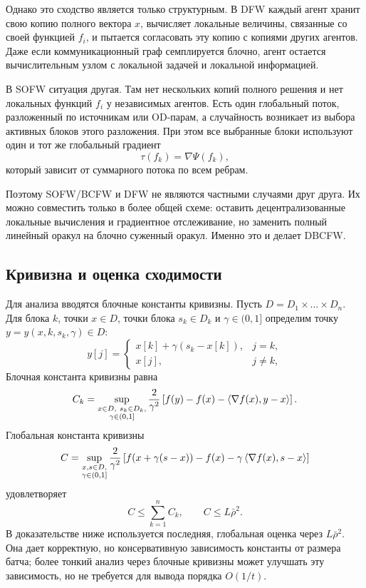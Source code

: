 Однако это сходство является только структурным.
В DFW каждый агент хранит свою копию полного вектора $x$, вычисляет локальные величины,
связанные со своей функцией $f_i$, и пытается согласовать эту копию с копиями других агентов.
Даже если коммуникационный граф семплируется блочно, агент остается вычислительным узлом с
локальной задачей и локальной информацией.

В SOFW ситуация другая.
Там нет нескольких копий полного решения и нет локальных функций $f_i$ у независимых агентов.
Есть один глобальный поток, разложенный по источникам или OD-парам, а случайность возникает
из выбора активных блоков этого разложения.
При этом все выбранные блоки используют один и тот же глобальный градиент
\[
    \tau(f_k)=\nabla\Psi(f_k),
\]
который зависит от суммарного потока по всем ребрам.

Поэтому SOFW/BCFW и DFW не являются частными случаями друг друга.
Их можно совместить только в более общей схеме: оставить децентрализованные локальные
вычисления и градиентное отслеживание, но заменить полный линейный оракул на блочно
суженный оракул.
Именно это и делает DBCFW.

\subsection{Кривизна и оценка сходимости}

Для анализа вводятся блочные константы кривизны.
Пусть $D=D_1\times\dots\times D_n$.
Для блока $k$, точки $x\in D$, точки блока $s_k\in D_k$ и $\gamma\in(0,1]$
определим точку $y=y(x,k,s_k,\gamma)\in D$:
\[
    y[j]=
    \begin{cases}
        x[k]+\gamma(s_k-x[k]), & j=k,\\
        x[j], & j\neq k,
    \end{cases}
\]
Блочная константа кривизны равна
\[
    C_k
    =
    \sup_{\substack{
        x\in D,\ s_k\in D_k,\\
        \gamma\in(0,1]
    }}
    \frac{2}{\gamma^2}
    \left[
        f(y)-f(x)-\left\langle \nabla f(x), y-x \right\rangle
    \right].
\]
Глобальная константа кривизны
\[
    C
    =
    \sup_{\substack{
        x,s\in D,\\
        \gamma\in(0,1]
    }}
    \frac{2}{\gamma^2}
    \left[
        f(x+\gamma(s-x))
        -
        f(x)
        -
        \gamma\left\langle \nabla f(x), s-x \right\rangle
    \right]
\]
удовлетворяет
\[
    C\leq\sum_{k=1}^{n}C_k,
    \qquad
    C\leq L\bar\rho^2.
\]
В доказательстве ниже используется последняя, глобальная оценка через $L\bar\rho^2$.
Она дает корректную, но консервативную зависимость константы от размера батча; более тонкий
анализ через блочные кривизны может улучшать эту зависимость, но не требуется для вывода
порядка $O(1/t)$.

